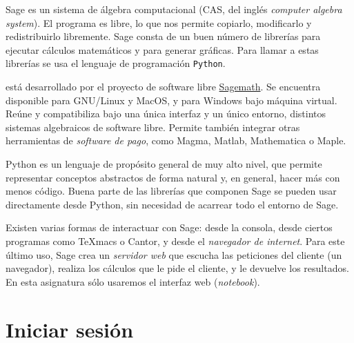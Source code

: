 Sage es un sistema de álgebra computacional (CAS, del inglés \emph{computer
algebra system}).
El programa es libre, lo que nos permite copiarlo, modificarlo y redistribuirlo
libremente. Sage consta de un buen número de librerías para ejecutar cálculos
matemáticos y para generar gráficas. Para llamar a estas libre\-rías se usa el
lenguaje de programación \texttt{Python}.

{\sage} está desarrollado por el proyecto de software libre
\href{http://www.sagemath.org/}{Sagemath}. Se encuentra disponible para
GNU/Linux y MacOS, y para Windows bajo máquina virtual. Reúne y compatibiliza
bajo una única interfaz y un único entorno, distintos sistemas algebraicos de
software libre. Permite también integrar otras herramientas de {\itshape
software de pago}, como Magma, Matlab,  Mathematica o Maple.

Python es un lenguaje de propósito general de muy alto nivel, que permite
representar conceptos abstractos de forma
natural y, en general, hacer más con menos código. Buena parte de las librerías
que componen Sage se pueden usar
directamente desde Python, sin necesidad de acarrear todo el entorno de Sage.


Existen varias formas de interactuar con Sage: desde la consola, desde ciertos
programas como TeXmacs o Cantor, y desde el \emph{navegador de internet}. Para
este último uso, Sage crea un \emph{servidor web} que escucha las peticiones del
cliente (un navegador), realiza los cálculos que le pide el cliente, y le
devuelve los resultados. 
En esta asignatura sólo usaremos el interfaz web (\emph{notebook}). 

\section{Iniciar sesión}

